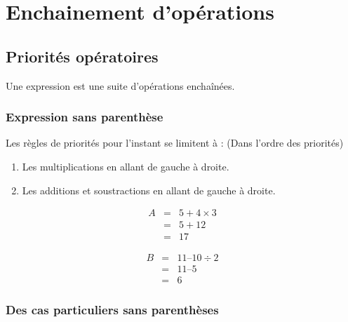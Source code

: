 \documentclass[a4paper,10pt]{report}
\begin{document}
\pagestyle{empty}
\newpage
\setcounter{chapter}{2}
\chapter{Enchainement d'opérations}

\section{Priorités opératoires}

Une expression est une suite d'opérations enchaînées.
	
\subsection{Expression sans parenthèse}

\begin{prop}
Les règles de priorités pour l'instant se limitent à : (Dans l'ordre des priorités)
\begin{enumerate}
	\item Les multiplications en allant de gauche à droite.
	\item Les additions et soustractions en allant de gauche à droite.
\end{enumerate}
\end{prop}
 
\begin{ex}

\vspace{-1cm} \hspace{3cm}
\begin{minipage}{6cm}
\begin{eqnarray*}
A &=& 5 + 4 \times 3 \\
&=& 5 + 12 \\
&=& 17
\end{eqnarray*}
\end{minipage}
\begin{minipage}{6cm}
\begin{eqnarray*}
B &=& 11 – 10 \div 2\\
&=& 11 – 5\\
&=& 6
\end{eqnarray*}
\end{minipage}
\end{ex}
 
\subsection{Des cas particuliers sans parenthèses}
\end{document}
